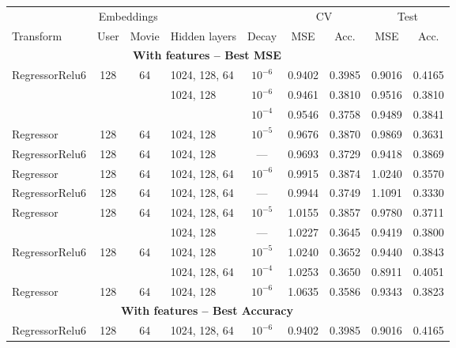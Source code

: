 \begin{table}[H]
\centering
\small
\begin{tabular}{lcclccccc}
\toprule
           & \multicolumn{2}{c}{Embeddings} &  &   &  \multicolumn{2}{c}{CV} & \multicolumn{2}{c}{Test} \\
           \cmidrule(lr){2-3}\cmidrule(lr){6-7}\cmidrule(l){8-9}
Transform & User & Movie & Hidden layers &  Decay & MSE & Acc. & MSE & Acc.  \\
\midrule
\multicolumn{8}{c}{\textbf{With features -- Best MSE}}\\\addlinespace
RegressorRelu6 & 128 & 64 & 1024, 128, 64 & $10^{-6}$   &  0.9402 &      0.3985 &   0.9016 &        0.4165 \\
           &     &    & 1024, 128 & $10^{-6}$   &  0.9461 &      0.3810 &   0.9516 &        0.3810 \\
           &     &    &                                 & $10^{-4}$   &  0.9546 &      0.3758 &   0.9489 &        0.3841 \\
Regressor & 128 & 64 & 1024, 128 & $10^{-5}$   &  0.9676 &      0.3870 &   0.9869 &        0.3631 \\
RegressorRelu6 & 128 & 64 & 1024, 128 & ---   &  0.9693 &      0.3729 &   0.9418 &        0.3869 \\
Regressor & 128 & 64 & 1024, 128, 64 & $10^{-6}$   &  0.9915 &      0.3874 &   1.0240 &        0.3570 \\
RegressorRelu6 & 128 & 64 & 1024, 128, 64 & ---   &  0.9944 &      0.3749 &   1.1091 &        0.3330 \\
Regressor & 128 & 64 & 1024, 128, 64 & $10^{-5}$   &  1.0155 &      0.3857 &   0.9780 &        0.3711 \\
           &     &    & 1024, 128 & ---   &  1.0227 &      0.3645 &   0.9419 &        0.3800 \\
RegressorRelu6 & 128 & 64 & 1024, 128 & $10^{-5}$   &  1.0240 &      0.3652 &   0.9440 &        0.3843 \\
           &     &    & 1024, 128, 64 & $10^{-4}$   &  1.0253 &      0.3650 &   0.8911 &        0.4051 \\
Regressor & 128 & 64 & 1024, 128 & $10^{-6}$   &  1.0635 &      0.3586 &   0.9343 &        0.3823 \\
\midrule
\multicolumn{8}{c}{\textbf{With features -- Best Accuracy}}\\\addlinespace
RegressorRelu6 & 128 & 64 & 1024, 128, 64 & $10^{-6}$   &  0.9402 &      0.3985 &   0.9016 &        0.4165 \\

\end{tabular}
\end{table}
